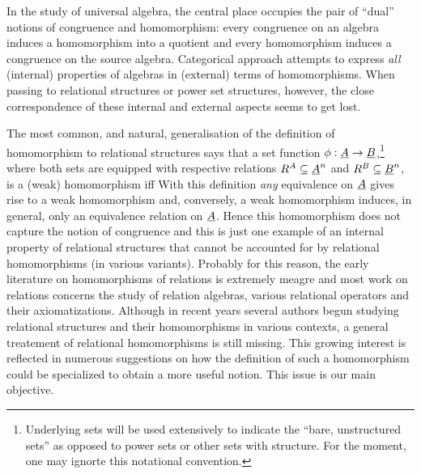 \documentclass[10pt]{article}
\begin{document}
In the study of universal algebra, the central place occupies the pair
of ``dual'' notions of congruence and homomorphism: every congruence
on an algebra induces a homomorphism into a quotient and every
homomorphism induces a congruence on the source algebra.  Categorical
approach attempts to express {\em all} (internal) properties of
algebras in (external) terms of homomorphisms.  When
passing to relational structures or power set structures, however, the 
close correspondence of
these internal and external aspects seems to get lost.


The most common, and natural, generalisation of the definition of
homomorphism to relational structures says that a set function
$\phi:\underline {A}\rightarrow \underline {B}$,\footnote{Underlying sets will be used extensively to
indicate the ``bare, unstructured sets'' as opposed to power sets or other sets with
structure. For the moment, one may ignorte this notational convention.} 
where both sets are equipped with
respective relations $R^A\subseteq \underline {A}^n$ and $R^B\subseteq
\underline {B}^n$, is a (weak) homomorphism 
iff 
With this definition {\em any} equivalence on $\underline {A}$ gives rise
to a weak homomorphism and, conversely, a weak homomorphism induces,
in general, only an equivalence relation on $\underline {A}$.  Hence this
homomorphism does not capture the notion of congruence and this is
just one example of an internal property of relational structures that
cannot be accounted for by relational homomorphisms (in various
variants).  
Probably for this reason, the early literature on
homomorphisms of relations is extremely meagre \cite{Most,c:101} and
most work on relations concerns the study of relation algebras,
various relational operators and their axiomatizations. 
Although in recent years 
several authors begun studying relational structures and their homomorphisms
 in various contexts, a general
treatement of relational homomorphisms is still missing.
This growing interest is reflected in numerous
suggestions on how the definition of such a homomorphism could be
specialized  to obtain a more useful notion.  This issue is
our main objective.
\end{document}
